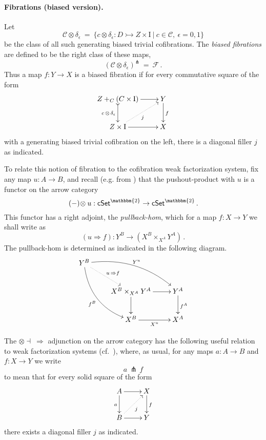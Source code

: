 \documentclass[12pt]{article}
\newcommand{\cSet}{\ensuremath{\mathsf{cSet}}}
\newcommand{\mono}{\ensuremath{\rightarrowtail}}
\newcommand{\ra}{\ensuremath{\rightarrow}}
\renewcommand{\to}{\ensuremath{\rightarrow}}
\newcommand{\too}{\ensuremath{\longrightarrow}}
\newcommand{\I}{\ensuremath{\mathrm{I}}}
\theoremstyle{remark}
\theoremstyle{definition}
\begin{document}
\paragraph{Fibrations (biased version).}
Let 
\[
\mathcal{C}\otimes \delta_\epsilon\ =\ \{ c \otimes \delta_\epsilon : D \mono Z \times \I\ |\ c \in\mathcal{C},\ \epsilon = 0,1 \}
\]
be the class of all such generating biased trivial cofibrations.
The \emph{biased fibrations} are defined to be the right class of these maps,
\[
(\mathcal{C}\otimes \delta_\epsilon)^\pitchfork\ =\ \mathcal{F}\,.
\]
Thus a map $f : Y\ra X$ is a biased fibration if for every commutative square of the form
\begin{equation}\label{diagram:biasedfillers}
\xymatrix{
Z +_C (C\times\I) \ar@{>->}[d]_{c\, \otimes\, \delta_\epsilon} \ar[r] & Y \ar[d]^f \\
Z\times \I \ar@{.>}[ru]_{j} \ar[r] & X
}
\end{equation}
with a generating biased trivial cofibration on the left, there is a diagonal filler $j$ as indicated. %

To relate this notion of fibration to the cofibration weak factorization system, fix any map $u : A \ra B$, and recall (e.g. from \cite{R}) that the pushout-product with $u$ is a functor on the arrow category 
\[
(-)\!\otimes u : \cSet^\mathbbm{2} \ra\cSet^\mathbbm{2}\,.
\]
This functor has a right adjoint, the \emph{pullback-hom}, which for a map $f : X\ra Y$ we shall write as
\[
(u \Rightarrow\! f) : Y^B \too (X^B \times_{X^A} Y^A) \,.
\]
The pullback-hom is determined as indicated in the following diagram.
\begin{equation}\label{diagram:pullbackhom}
\xymatrix{
Y^B \ar@/_4ex/[rdd]_{f^B} \ar@{.>}[rd]^{u\, \Rightarrow f} \ar@/^4ex/ [rrd]^{Y^u} && \\
& X^B \times_{X^A} Y^A \ar[d] \ar[r] & Y^A \ar[d]^{f^A} \\
& X^B \ar[r]_{X^u} &  X^A 
}
\end{equation}

The $\otimes\dashv\ \Rightarrow$ adjunction on the arrow category has the following useful relation to weak factorization systems (cf.~\cite{GS,Riehl,JT}), where, as usual, for any maps $a : A \ra B$ and $f : X\ra Y$ we write 
\[
a\, \pitchfork\, f 
\]
to mean that for every solid square of the form
\begin{equation}\label{eq:defpitchfork}
\xymatrix{
A\ar[d]_{a} \ar[r] & X \ar[d]^f \\
B \ar@{.>}[ru]_j \ar[r] & Y
}
\end{equation}
there exists a diagonal filler $j$ as indicated. 
\end{document}
